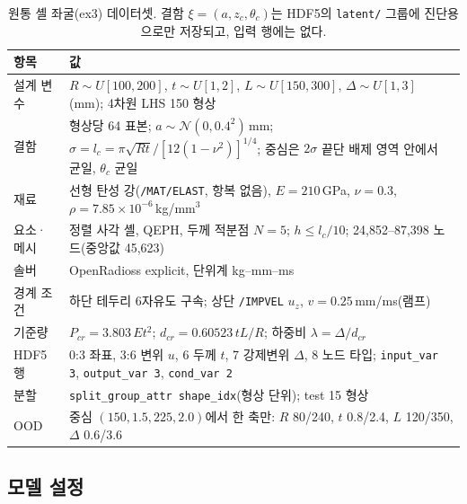 \documentclass[11pt]{article}
\newcommand{\N}{\mathcal{N}}
\newcommand{\code}[1]{\texttt{#1}}
\begin{document}
\begin{table}[!htbp]
\centering
\footnotesize
\begin{tabularx}{\textwidth}{@{}l Y@{}}
\toprule
항목 & 값 \\
\midrule
설계 변수 & $R\sim U[100,200]$, $t\sim U[1,2]$, $L\sim U[150,300]$, $\Delta\sim U[1,3]$ (mm); 4차원 LHS 150 형상 \\
결함 & 형상당 64 표본; $a\sim\N(0,0.4^2)$\,mm; $\sigma=l_c=\pi\sqrt{Rt}/[12(1-\nu^2)]^{1/4}$; 중심은 $2\sigma$ 끝단 배제 영역 안에서 균일, $\theta_c$ 균일 \\
재료 & 선형 탄성 강(\code{/MAT/ELAST}, 항복 없음), $E=210$\,GPa, $\nu=0.3$, $\rho=7.85\times10^{-6}$\,kg/mm$^3$ \\
요소·메시 & 정렬 사각 셸, QEPH, 두께 적분점 $N=5$; $h\le l_c/10$; 24,852--87,398 노드(중앙값 45,623) \\
솔버 & OpenRadioss explicit, 단위계 kg--mm--ms \\
경계 조건 & 하단 테두리 6자유도 구속; 상단 \code{/IMPVEL} $u_z$, $v=0.25$\,mm/ms(램프) \\
기준량 & $P_{cr}=3.803\,Et^2$; $d_{cr}=0.60523\,tL/R$; 하중비 $\lambda=\Delta/d_{cr}$ \\
HDF5 행 & 0:3 좌표, 3:6 변위 $u$, 6 두께 $t$, 7 강제변위 $\Delta$, 8 노드 타입; \code{input\_var 3}, \code{output\_var 3}, \code{cond\_var 2} \\
분할 & \code{split\_group\_attr shape\_idx}(형상 단위); test 15 형상 \\
OOD & 중심 $(150, 1.5, 225, 2.0)$에서 한 축만: $R$ 80/240, $t$ 0.8/2.4, $L$ 120/350, $\Delta$ 0.6/3.6 \\
\bottomrule
\end{tabularx}
\caption{원통 셸 좌굴(ex3) 데이터셋. 결함 $\xi=(a,z_c,\theta_c)$는 HDF5의
  \code{latent/} 그룹에 진단용으로만 저장되고, 입력 행에는 없다.}
\label{tab:dataset}
\end{table}

\subsection{모델 설정}
\end{document}
